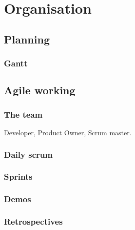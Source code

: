 \chapter{Organisation}

\section{Planning}
\subsection{Gantt}
%

\section{Agile working}
\subsection{The team}
Developer, Product Owner, Scrum master.
\subsection{Daily scrum}
\subsection{Sprints}
\subsection{Demos}
\subsection{Retrospectives}

